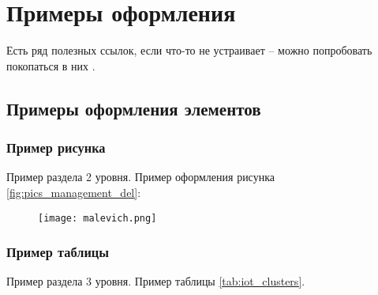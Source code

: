 \documentclass[../main]{subfiles}
\begin{document}
\newpage
\section{Примеры оформления}
\label{sec:subject_domain}

Есть ряд полезных ссылок, если что-то не устраивает -- можно попробовать покопаться в них \cite{gost-docs, gost-repo, gost-examples, master-report-repo}.

\subsection{Примеры оформления элементов}
\subsubsection{Пример рисунка}
Пример раздела 2 уровня. Пример оформления рисунка \ref{fig:pics_management_del}:

\begin{figure}[H]
    \centering
    {\texttt{[image: malevich.png]}}
    \vspace{-\baselineskip}
\end{figure}

\subsubsection{Пример таблицы}
Пример раздела 3 уровня. Пример таблицы \ref{tab:iot_clusters}.
\end{document}
